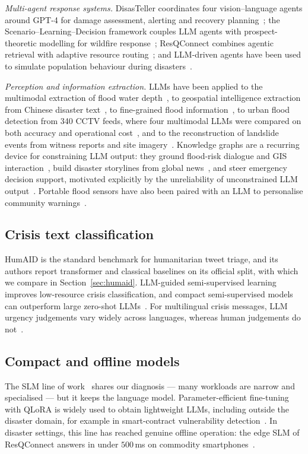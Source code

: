 \documentclass[journal]{IEEEtran}
\begin{document}
\textit{Multi-agent response systems.} DisasTeller coordinates four
vision--language agents around GPT-4 for damage assessment, alerting and
recovery planning~\cite{chen2026integration}; the Scenario--Learning--Decision
framework couples LLM agents with prospect-theoretic modelling for wildfire
response~\cite{wang2025towards}; ResQConnect combines agentic retrieval with
adaptive resource routing~\cite{aththanayake2026resqconnect}; and LLM-driven
agents have been used to simulate population behaviour during
disasters~\cite{sultimov2026respond}.

\textit{Perception and information extraction.} LLMs have been applied to the
multimodal extraction of flood water depth~\cite{yang2026automated}, to
geospatial intelligence extraction from Chinese disaster
text~\cite{han2025fine}, to fine-grained flood
information~\cite{wang2025fine}, to urban flood detection from 340 CCTV feeds,
where four multimodal LLMs were compared on both accuracy and operational
cost~\cite{yang2025novel}, and to the reconstruction of landslide events from
witness reports and site imagery~\cite{pang2026reconstruction}. Knowledge
graphs are a recurring device for constraining LLM output: they ground
flood-risk dialogue and GIS interaction~\cite{zhu2024flood}, build disaster
storylines from global news~\cite{ronco2026disaster}, and steer emergency
decision support, motivated explicitly by the unreliability of unconstrained
LLM output~\cite{chen2024enhancing}. Portable flood sensors have also been
paired with an LLM to personalise community warnings~\cite{ou2025combination}.

\subsection{Crisis text classification}
HumAID is the standard benchmark for humanitarian tweet triage, and its
authors report transformer and classical baselines on its official split, with
which we compare in Section~\ref{sec:humaid}. LLM-guided semi-supervised
learning improves low-resource crisis classification, and compact
semi-supervised models can outperform large zero-shot LLMs~\cite{ativo2026llm}.
For multilingual crisis messages, LLM urgency judgements vary widely across
languages, whereas human judgements do not~\cite{ticona2026llm}.

\subsection{Compact and offline models}
The SLM line of work~\cite{wang2024comprehensive} shares our diagnosis --- many
workloads are narrow and specialised --- but it keeps the language model.
Parameter-efficient fine-tuning with QLoRA is widely used to obtain lightweight
LLMs, including outside the disaster domain, for example in smart-contract
vulnerability detection~\cite{mandana2025evullm}. In disaster settings, this
line has reached genuine offline operation: the edge SLM of ResQConnect answers
in under $500$\,ms on commodity smartphones~\cite{aththanayake2026resqconnect}.
\end{document}
